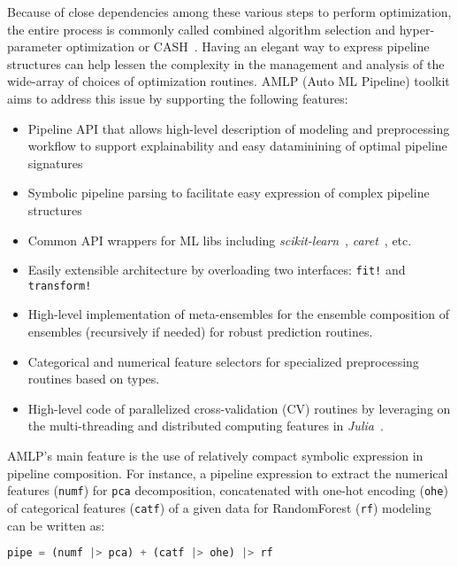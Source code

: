\documentclass{juliacon}
\begin{document}
\vskip 6pt

Because of close dependencies among these various steps to perform
optimization, the entire process is commonly called combined algorithm
selection and hyper-parameter
optimization or CASH~\cite{feurer2015askl,Thornton:KDD2013}.  Having an elegant way to
express pipeline structures can help lessen the complexity in the management
and analysis of the wide-array of choices of optimization routines. AMLP (Auto
ML Pipeline) toolkit aims to address  this issue by supporting the following
features:
\begin{itemize}
\item Pipeline API that allows high-level description of modeling and 
      preprocessing workflow to support explainability and easy 
      dataminining of optimal pipeline signatures
\item Symbolic pipeline parsing to facilitate easy expression 
      of complex pipeline structures
\item Common API wrappers for ML libs including
      \emph{scikit-learn}~\cite{pedregosa2011},
      \emph{caret}~\cite{caret2008}, etc.
\item Easily extensible architecture by
      overloading two interfaces: \texttt{fit!} and \texttt{transform!}
\item High-level implementation of meta-ensembles
      for the ensemble composition of ensembles (recursively if needed) for robust prediction routines.
\item Categorical and numerical feature selectors
      for specialized preprocessing routines based on types.
\item High-level code of parallelized cross-validation (CV)
      routines by leveraging on the multi-threading and
      distributed computing features
      in \emph{Julia}~\cite{bezanson2017julia}.
\end{itemize}

AMLP's main feature is the use of relatively compact symbolic expression in
pipeline composition.  For instance, a pipeline expression to extract the
numerical features (\texttt{numf}) for 
\texttt{pca} decomposition, concatenated with one-hot
encoding (\texttt{ohe}) of categorical features (\texttt{catf})
of a given data for RandomForest (\texttt{rf}) modeling can be written
as:
\begin{lstlisting}[language=Julia,numbers=none]
   pipe = (numf |> pca) + (catf |> ohe) |> rf 
\end{lstlisting}

\vskip 6pt
\end{document}
